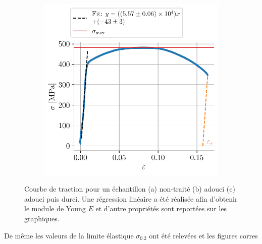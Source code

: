\begin{figure}[H]
\begin{subfigure}{0.48\linewidth}
        \caption{}
        \label{fig:chaud3}
    \end{subfigure}
    \begin{subfigure}{0.48\linewidth}
        \centering
        \includegraphics[width=\linewidth]{figures/tiede6_annotated.pdf}
        \caption{}
        \label{fig:tiede6}
    \end{subfigure}
    \caption{Courbe de traction pour un échantillon (a) non-traité (b) adouci (c) adouci puis durci. Une régression linéaire a été réalisée afin d'obtenir le module de Young \(E\) et d'autre propriétés sont reportées sur les graphiques.}
    \label{fig:tractions_exp}
\end{figure}


De même les valeurs de la limite élastique $\sigma_{0.2}$ ont été relevées et les figures corres


